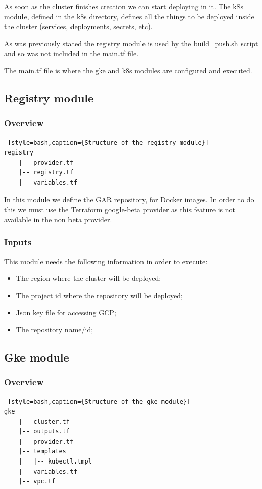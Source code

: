 \documentclass[12pt,a4paper,oneside]{report}
\begin{document}
As soon as the cluster finishes creation we can start deploying in it. The k8s module, defined in the k8s directory, defines all the things to be deployed inside the cluster (services, deployments, secrets, etc).

As was previously stated the registry module is used by the build\_push.sh script and so was not included in the main.tf file.

The main.tf file is where the gke and k8s modules are configured and executed. 

\subsection{Registry module}
\subsubsection{Overview}
\begin{lstlisting} [style=bash,caption={Structure of the registry module}]
registry
    |-- provider.tf
    |-- registry.tf
    |-- variables.tf
\end{lstlisting}

In this module we define the \ac{GAR} repository, for Docker images.
In order to do this we must use the \href{https://registry.terraform.io/providers/hashicorp/google-beta/latest}{Terraform google-beta provider} as this feature is not available in the non beta provider. 

\subsubsection{Inputs}
This module needs the following information in order to execute:
\begin{itemize}
    \item The region where the cluster will be deployed;
    \item The project id where the repository will be deployed;
    \item Json key file for accessing \ac{GCP};
    \item The repository name/id;
\end{itemize}

\subsection{Gke module}
\subsubsection{Overview}
\begin{lstlisting} [style=bash,caption={Structure of the gke module}]
gke
    |-- cluster.tf
    |-- outputs.tf
    |-- provider.tf
    |-- templates
    |   |-- kubectl.tmpl
    |-- variables.tf
    |-- vpc.tf
\end{lstlisting}
\end{document}
